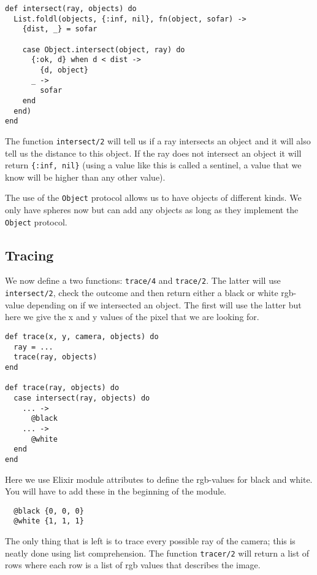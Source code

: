 \documentclass[a4paper,11pt]{article}
\begin{document}
\begin{verbatim}
def intersect(ray, objects) do
  List.foldl(objects, {:inf, nil}, fn(object, sofar) ->
    {dist, _} = sofar

    case Object.intersect(object, ray) do
      {:ok, d} when d < dist ->
        {d, object}
      _ ->
        sofar
    end
  end)
end
\end{verbatim}

The function {\tt intersect/2} will tell us if a ray intersects an
object and it will also tell us the distance to this object. If the
ray does not intersect an object it will return {\tt \{:inf, nil\}}
(using a value like this is called a sentinel, a value that we know
will be higher than any other value).

The use of the {\tt Object} protocol allows us to have objects of
different kinds. We only have spheres now but can add any objects as
long as they implement the {\tt Object} protocol.

\subsection*{Tracing}

We now define a two functions: {\tt trace/4} and {\tt trace/2}. The
latter will use {\tt intersect/2}, check the outcome and then return
either a black or white rgb-value depending on if we intersected an
object. The first will use the latter but here we give the x and y
values of the pixel that we are looking for.

\begin{verbatim}
def trace(x, y, camera, objects) do
  ray = ...
  trace(ray, objects)
end

def trace(ray, objects) do
  case intersect(ray, objects) do
    ... ->
      @black
    ... ->
      @white
  end
end
\end{verbatim}

Here we use Elixir module attributes to define the rgb-values for
black and white. You will have to add these in the beginning of the
module.

\begin{verbatim}
  @black {0, 0, 0}
  @white {1, 1, 1}
\end{verbatim}

The only thing that is left is to trace every possible ray of the
camera; this is neatly done using list comprehension. The function
{\tt tracer/2} will return a list of rows where each row is a list of
rgb values that describes the image.
\end{document}
